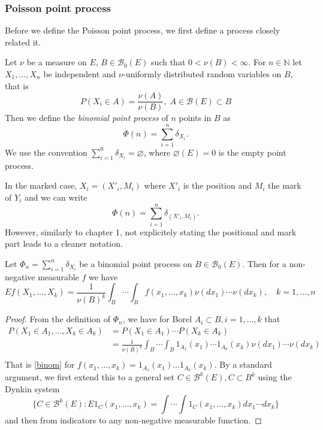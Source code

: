 
\subsubsection{Poisson point process}
Before we define the Poisson point process, we first define a process closely related it.

\begin{definition} Let $\nu$ be a measure on $E$, $B \in \mathcal B_0(E)$ such that $0<\nu(B)<\infty$. For $n\in \mathbb N$ let $X_1,\dots,X_n$ be independent and $\nu$-uniformly distributed random variables on $B$, that is
	$$P(X_i \in A) = \frac{\nu(A)}{\nu(B)},\; A\in\mathcal B(E) \subset B$$
Then we define the \textit{binomial point process} of $n$ points in $B$ as
$$\Phi(n) = \sum^{n}_{i=1}  \delta_{X_i}.$$
We use the convention $\sum^0_{i=1} \delta_{X_i} = \varnothing$, where $\varnothing(E)=0$ is the empty point process.
\end{definition}
In the marked case, $X_i=(X'_i,M_i)$ where $X'_i$ is the position and $M_i$ the mark of $Y_i$ and we can write
$$\Phi(n) = \sum^{n}_{i=1} \delta_{(X'_i,M_i)}.$$
However, similarly to chapter 1, not explicitely stating the positional and mark part leads to a cleaner notation.

\begin{proposition}\label{bincalc}
	Let $\Phi_n = \sum^{n}_{i=1}  \delta_{X_i}$ be a binomial point process on $B\in\mathcal B_0(E)$. Then for a non-negative measurable $f$ we have
\begin{equation}\label{binom}
	Ef(X_1,\dots, X_k) = \frac 1{\nu(B)^k} \int_B \cdots \int_B f(x_1,\dots, x_k) \nu(dx_1) \cdots \nu(dx_k), \quad k = 1,\dots, n
\end{equation}
\end{proposition}
\begin{proof}
From the definition of $\Phi_n$, we have for Borel $A_i \subset B, i=1,\dots,k$ that
\begin{align*}
P(X_1 \in A_1, \dots, X_k \in A_k) &= P(X_1\in A_1)\cdots P(X_k\in A_k) \\ 
& = \frac 1{\nu(B)^k} \int_B \cdots \int_B 1_{A_1}(x_1) \cdots 1_{A_k}(x_k) \nu(dx_1) \cdots \nu(dx_k) \\
\end{align*}
That is \ref{binom} for $f(x_1,\dots,x_k)=1_{A_1}(x_1)\dots 1_{A_k}(x_k)$. By a standard argument, we first extend this to a general set $C \in \mathcal B^k(E), C\subset B^k$ using the Dynkin system 
$$\{C \in \mathcal B^k(E): E 1_C (x_1,\dots,x_k) = \int \cdots \int 1_C(x_1,\dots, x_k) dx_1 \cdots dx_k \}$$
 and then from indicators to any non-negative measurable function.
\end{proof}

